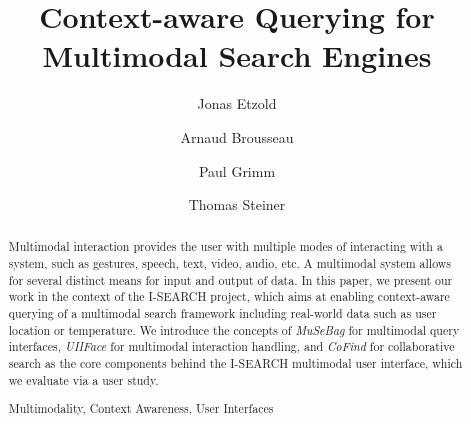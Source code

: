\documentclass[runningheads,a4paper]{llncs} \usepackage[utf8]{inputenc}
\newcommand{\keywords}[1]{\par\addvspace\baselineskip
\noindent\keywordname\enspace\ignorespaces#1}
\begin{document}
\mainmatter  %

\title{Context-aware Querying for\\ Multimodal Search Engines}


\author{Jonas Etzold \and Arnaud Brousseau \and Paul Grimm \and Thomas Steiner}



\maketitle

\begin{abstract}
Multimodal interaction provides the user with multiple modes of interacting with
a system, such as gestures, speech, text, video, audio, etc. A multimodal system allows for several distinct means for input and output of data. In this paper, we present our work in the context of the \mbox{I-SEARCH} project, which aims at enabling context-aware querying of a multimodal search framework including real-world data such as user location or temperature. We introduce the concepts of \emph{MuSeBag} for multimodal query interfaces, \emph{UIIFace} for multimodal interaction handling, and \emph{CoFind} for collaborative search as the core components behind the I-SEARCH multimodal user interface, which we evaluate via a user study.

\keywords{Multimodality, Context Awareness, User Interfaces}
\end{abstract}
\end{document}
